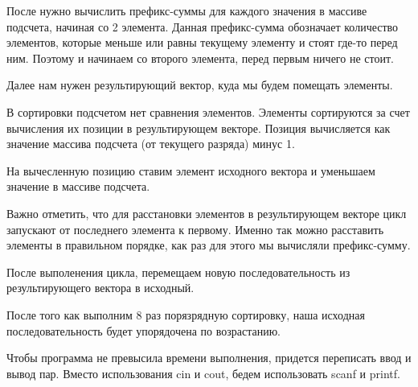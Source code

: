 После нужно вычислить префикс-суммы для каждого значения в массиве подсчета, начиная со 2 элемента.
Данная префикс-сумма обозначает количество элементов, которые меньше или равны текущему элементу и стоят где-то перед ним.
Поэтому и начинаем со второго элемента, перед первым ничего не стоит.

Далее нам нужен результирующий вектор, куда мы будем помещать элементы. 

В сортировки подсчетом нет сравнения элементов. Элементы сортируются за счет вычисления их позиции в результирующем векторе.
Позиция вычисляется как значение массива подсчета (от текущего разряда) минус 1.

На вычесленную позицию ставим элемент исходного вектора и уменьшаем значение в массиве подсчета.

Важно отметить, что для расстановки элементов в результирующем векторе цикл запускают от последнего элемента к первому.
Именно так можно расставить элементы в правильном порядке, как раз для этого мы вычисляли префикс-сумму.

После выполенения цикла, перемещаем новую последовательность из результирующего вектора в исходный.

После того как выполним 8 раз порязрядную сортировку, наша исходная последовательность будет упорядочена по возрастанию.


Чтобы программа не превысила времени выполнения, придется переписать ввод и вывод пар. Вместо использования cin  и cout,
бедем использовать scanf и printf.\\\\


